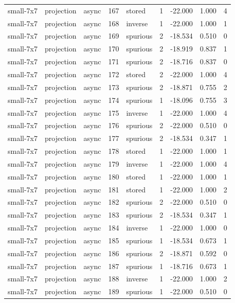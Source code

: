 \begin{tabular}{lllrlrrrr}
small-7x7 & projection & async & 167 & stored & 1 & -22.000 & 1.000 & 4 \\
small-7x7 & projection & async & 168 & inverse & 1 & -22.000 & 1.000 & 1 \\
small-7x7 & projection & async & 169 & spurious & 2 & -18.534 & 0.510 & 0 \\
small-7x7 & projection & async & 170 & spurious & 2 & -18.919 & 0.837 & 1 \\
small-7x7 & projection & async & 171 & spurious & 2 & -18.716 & 0.837 & 0 \\
small-7x7 & projection & async & 172 & stored & 2 & -22.000 & 1.000 & 4 \\
small-7x7 & projection & async & 173 & spurious & 2 & -18.871 & 0.755 & 2 \\
small-7x7 & projection & async & 174 & spurious & 1 & -18.096 & 0.755 & 3 \\
small-7x7 & projection & async & 175 & inverse & 1 & -22.000 & 1.000 & 4 \\
small-7x7 & projection & async & 176 & spurious & 2 & -22.000 & 0.510 & 0 \\
small-7x7 & projection & async & 177 & spurious & 2 & -18.534 & 0.347 & 1 \\
small-7x7 & projection & async & 178 & stored & 1 & -22.000 & 1.000 & 1 \\
small-7x7 & projection & async & 179 & inverse & 1 & -22.000 & 1.000 & 4 \\
small-7x7 & projection & async & 180 & stored & 1 & -22.000 & 1.000 & 1 \\
small-7x7 & projection & async & 181 & stored & 1 & -22.000 & 1.000 & 2 \\
small-7x7 & projection & async & 182 & spurious & 2 & -22.000 & 0.510 & 0 \\
small-7x7 & projection & async & 183 & spurious & 2 & -18.534 & 0.347 & 1 \\
small-7x7 & projection & async & 184 & inverse & 1 & -22.000 & 1.000 & 0 \\
small-7x7 & projection & async & 185 & spurious & 1 & -18.534 & 0.673 & 1 \\
small-7x7 & projection & async & 186 & spurious & 2 & -18.871 & 0.592 & 0 \\
small-7x7 & projection & async & 187 & spurious & 1 & -18.716 & 0.673 & 1 \\
small-7x7 & projection & async & 188 & inverse & 1 & -22.000 & 1.000 & 2 \\
small-7x7 & projection & async & 189 & spurious & 1 & -22.000 & 0.510 & 0 \\

\end{tabular}
